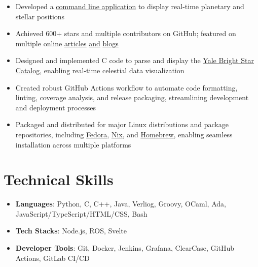 \documentclass[letterpaper,10pt]{article}
\newcommand{\itemsBegin}{
    \begin{itemize}[leftmargin=0.2in, labelsep=0.05in, itemsep=0pt, parsep=1pt, topsep=0pt, partopsep=0pt]
    \small
}
\newcommand{\itemsEnd}{\end{itemize}}
\begin{document}
    \itemsBegin{}
        \item Developed a
        \href{https://github.com/da-luce/astroterm}{\underline{command line application}}
        to display real-time planetary and stellar positions
        \item Achieved 600+ stars and multiple contributors on GitHub; featured on multiple online
        \href{https://www.linuxlinks.com/astroterm-terminal-based-star-map/}{\underline{articles}}
        \href{https://github.com/toolleeo/awesome-cli-apps-in-a-csv?tab=readme-ov-file#graphics}{\underline{and}}
        \href{https://terminaltrove.com/astroterm/}{\underline{blogs}}
        \item Designed and implemented C code to parse and display the
        \href{https://tdc-www.harvard.edu/catalogs/bsc5.html}{\underline{Yale Bright Star Catalog}},
        enabling real-time celestial data visualization
        \item Created robust GitHub Actions workflow to automate code formatting, linting, coverage analysis, and release packaging, streamlining development and deployment processes
        \item Packaged and distributed for major Linux distributions and package repositories, including
        \href{https://packages.fedoraproject.org/pkgs/astroterm/astroterm/index.html}{\underline{Fedora}},
        \href{https://search.nixos.org/packages?channel=unstable&show=astroterm&from=0&size=50&sort=relevance&type=packages&query=astroterm}{\underline{Nix}}, and
        \href{https://formulae.brew.sh/formula/astroterm#default}{\underline{Homebrew}},
        enabling seamless installation across multiple platforms
    \itemsEnd{}

\section{Technical Skills}

    \itemsBegin{}
        \item \textbf{Languages}{: Python, C, C++, Java, Verliog, Groovy, OCaml, Ada, JavaScript/TypeScript/HTML/CSS, Bash}
        \item \textbf{Tech Stacks}{: Node.js, ROS, Svelte}
        \item \textbf{Developer Tools}{: Git, Docker, Jenkins, Grafana, ClearCase, GitHub Actions, GitLab CI/CD }
    \itemsEnd{}
\end{document}
